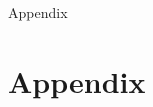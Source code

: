 \documentclass[mnsc,blindrev]{informs3} %
\begin{document}
%
\begin{APPENDIX}{Appendix}
	\setcounter{table}{0}
	\renewcommand{\thetable}{\Alph{subsection}.\arabic{table}}
	
	\setcounter{figure}{0}
	\renewcommand{\thefigure}{\Alph{subsection}.\arabic{figure}}
	\section{Appendix} \label{sec:appx}
	
\end{APPENDIX}
%
%


\ACKNOWLEDGMENT{\protect}





\end{document}
